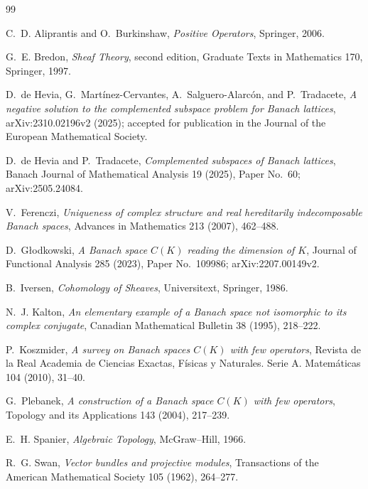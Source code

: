 \documentclass[11pt]{article}
\theoremstyle{definition}
\theoremstyle{remark}
\begin{document}
\begin{thebibliography}{99}

C.~D. Aliprantis and O.~Burkinshaw,
\emph{Positive Operators},
Springer, 2006.

G.~E. Bredon,
\emph{Sheaf Theory}, second edition,
Graduate Texts in Mathematics 170, Springer, 1997.

D.~de Hevia, G.~Mart\'inez-Cervantes, A.~Salguero-Alarc\'on, and P.~Tradacete,
\emph{A negative solution to the complemented subspace problem for Banach lattices},
arXiv:2310.02196v2 (2025); accepted for publication in the Journal of the European Mathematical Society.

D.~de Hevia and P.~Tradacete,
\emph{Complemented subspaces of Banach lattices},
Banach Journal of Mathematical Analysis 19 (2025), Paper No.~60; arXiv:2505.24084.

V.~Ferenczi,
\emph{Uniqueness of complex structure and real hereditarily indecomposable Banach spaces},
Advances in Mathematics 213 (2007), 462--488.

D.~G\l odkowski,
\emph{A Banach space $C(K)$ reading the dimension of $K$},
Journal of Functional Analysis 285 (2023), Paper No.~109986; arXiv:2207.00149v2.

B.~Iversen,
\emph{Cohomology of Sheaves},
Universitext, Springer, 1986.

N.~J. Kalton,
\emph{An elementary example of a Banach space not isomorphic to its complex conjugate},
Canadian Mathematical Bulletin 38 (1995), 218--222.

P.~Koszmider,
\emph{A survey on Banach spaces $C(K)$ with few operators},
Revista de la Real Academia de Ciencias Exactas, F\'isicas y Naturales. Serie A. Matem\'aticas 104 (2010), 31--40.

G.~Plebanek,
\emph{A construction of a Banach space $C(K)$ with few operators},
Topology and its Applications 143 (2004), 217--239.

E.~H. Spanier,
\emph{Algebraic Topology},
McGraw--Hill, 1966.

R.~G. Swan,
\emph{Vector bundles and projective modules},
Transactions of the American Mathematical Society 105 (1962), 264--277.

\end{thebibliography}
\end{document}
